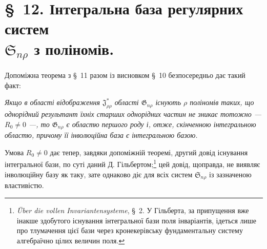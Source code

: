 \documentclass[11pt]{article}
\providecommand{\Ssys}{\mathfrak{S}}
\providecommand{\Jdom}{\mathfrak{J}}
\providecommand{\Gdom}{\mathfrak{G}}
\begin{document}
\section*{\S\ 12. Інтегральна база регулярних систем\\ $\Ssys_{n\rho}$ з поліномів.}

Допоміжна теорема з \S\ 11 разом із висновком \S\ 10 безпосередньо дає такий факт:

\emph{Якщо в області відображення $\Jdom^*_{\rho\rho}$ області $\Gdom_{n\rho}$ існують $\rho$ поліномів таких, що однорідний результант їхніх старших однорідних частин не зникає тотожно --- $R_0\ne0$ ---, то $\Gdom_{n\rho}$ є областю першого роду і, отже, скінченною інтегральною областю, причому її інволюційна база є інтегральною базою.}

Умова $R_0\ne0$ дає тепер, завдяки допоміжній теоремі, другий довід існування інтегральної бази, по суті даний Д. Гільбертом;\footnote{\emph{Über die vollen Invariantensysteme}, \S\ 2. У Гільберта, за припущення вже інакше здобутого існування інтегральної бази поля інваріантів, ідеться лише про тлумачення цієї бази через кронекерівську фундаментальну систему алгебраїчно цілих величин поля.} цей довід, щоправда, не виявляє інволюційну базу як таку, зате однаково діє для всіх систем $\Ssys_{n\rho}$ із зазначеною властивістю.
\end{document}

